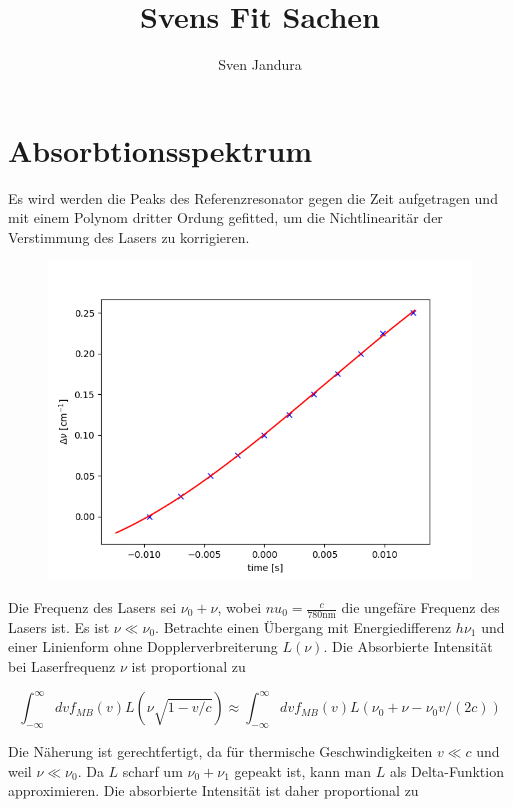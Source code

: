 \documentclass[a4paper,parskip]{scrartcl}
\author{Sven Jandura}
\title{Svens Fit Sachen}
\begin{document}
\maketitle

\tableofcontents

\section{Absorbtionsspektrum}

Es wird werden die Peaks des Referenzresonator gegen die Zeit aufgetragen und mit einem Polynom dritter Ordung gefitted, um die Nichtlinearitär der Verstimmung des Lasers zu korrigieren.

\begin{figure}[h]
\includegraphics[scale = 0.5]{./absorbtion/frequencyCorrection}
\end{figure}

Die Frequenz des Lasers sei $\nu_0+\nu$, wobei $nu_0=\frac{c}{780\mathrm{nm}}$ die ungefäre Frequenz des Lasers ist. Es ist $\nu \ll \nu_0$.
Betrachte einen Übergang mit Energiedifferenz $h\nu_1$ und einer Linienform ohne Dopplerverbreiterung $L(\nu)$.  Die Absorbierte Intensität bei Laserfrequenz $\nu$ ist proportional zu

$$\int_{-\infty}^{\infty} dv f_{MB}(v)L(\nu\sqrt{1-v/c}) \approx \int_{-\infty}^{\infty} dv f_{MB}(v)L(\nu_0+\nu-\nu_0 v/(2c))$$

Die Näherung ist gerechtfertigt, da für thermische Geschwindigkeiten $v \ll c$ und weil $\nu \ll \nu_0$. Da $L$ scharf um $\nu_0 + \nu_1$ gepeakt ist, kann man $L$ als Delta-Funktion approximieren. Die absorbierte Intensität ist daher proportional zu
\end{document}
